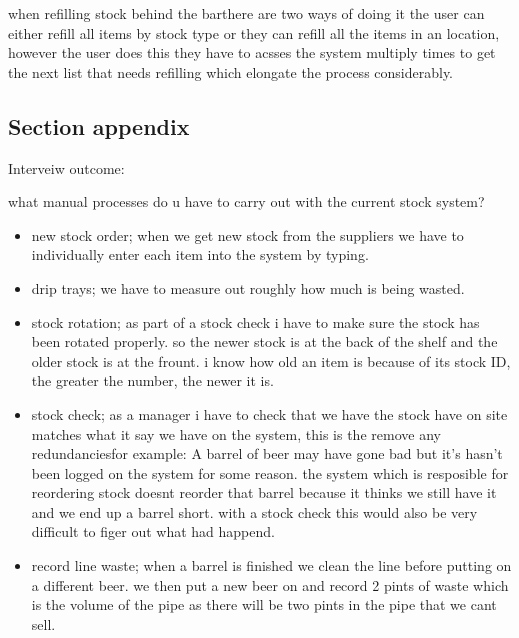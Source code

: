 when refilling stock behind the barthere are two ways of doing it the user can either refill all items by stock type or they can refill all the items in an location, however the user does this they have to acsses the system multiply times to get the next list that needs refilling which elongate the process considerably.



\subsection{Section appendix}

Interveiw outcome:

what manual processes do u have to carry out with the current stock system?
\begin{itemize}
    \item new stock order; when we get new stock from the suppliers we have to individually enter each item into the system by typing.
    \item drip trays; we have to measure out roughly how much is being wasted.
	\item stock rotation; as part of a stock check i have to make sure the stock has been rotated properly. so the newer stock is at the back of the shelf and the older stock is at the frount. i know how old an item is because of its stock ID, the greater the number, the newer it is.
	\item stock check; as a manager i have to check that we have the stock have on site matches what it say we have on the system, this is the remove any redundanciesfor example: A barrel of beer may have gone bad but it's hasn't been logged on the system for some reason. the system which is resposible for reordering stock doesnt reorder that barrel because it thinks we still have it and we end up a barrel short. with a stock check this would also be very difficult to figer out what had happend.
	\item record line waste; when a barrel is finished we clean the line before putting on a different beer. we then put a new beer on and record 2 pints of waste which is the volume of the pipe as there will be two pints in the pipe that we cant sell.
\end{itemize}

